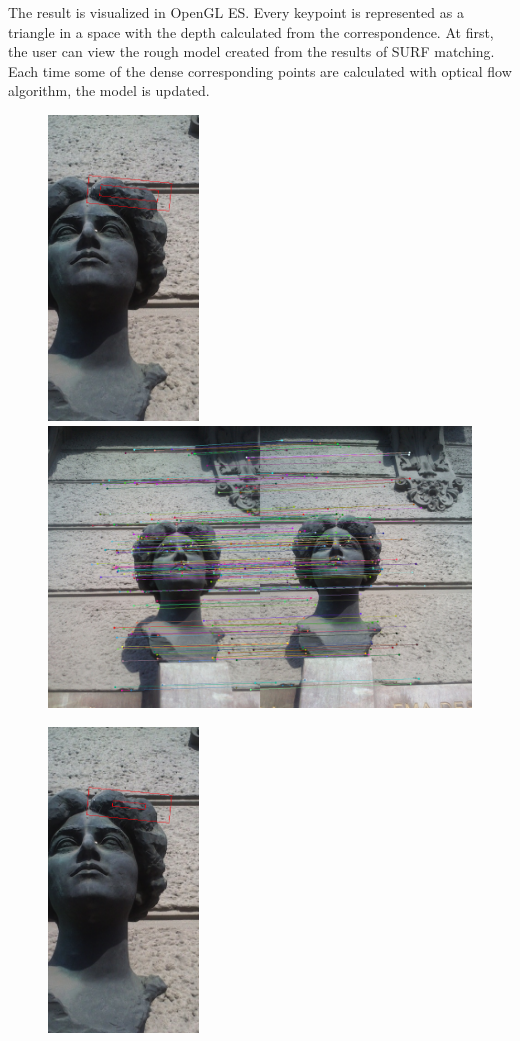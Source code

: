The result is visualized in OpenGL ES.
Every keypoint is represented as a triangle in a space with the depth calculated from the correspondence.
At first, the user can view the rough model created from the results of SURF matching.
Each time some of the dense corresponding points are calculated with optical flow algorithm, the model is updated.

\begin{figure}[h]
\centerline{
\includegraphics[width=4.0cm]{img/rectangle_w_02_h_035_croped.png}
\includegraphics[width=12.1cm]{img/matching_w_02_h_035.png}}
\centerline{
\includegraphics[width=4.0cm]{img/rectangle_w_01__h_02_croped.png}
}
\end{figure}

